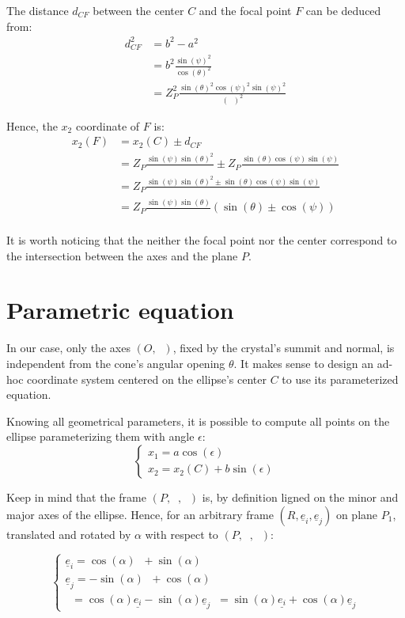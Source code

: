 \documentclass[a4paper,11pt,twoside,titlepage,openright]{book}
\numberwithin{equation}{section}
\newcommand{\ud}[1]{\underline{#1}}
\newcommand{\lt}{\left}
\newcommand{\rt}{\right}
\DeclareMathOperator{\ei}{\underline{e}_1}
\DeclareMathOperator{\et}{\underline{e}_2}
\DeclareMathOperator{\ez}{\underline{e}_z}
\DeclareMathOperator{\DD}{\cos(\theta)^2 - \sin(\psi)^2}
\begin{document}
The distance $d_{CF}$ between the center $C$ and the focal point $F$ can be deduced from:
$$
\begin{array}{lll}
	d_{CF}^2 & = b^2-a^2\\
		& = b^2\frac{\sin(\psi)^2}{\cos(\theta)^2}\\
		& = Z_P^2\frac{\sin(\theta)^2\cos(\psi)^2\sin(\psi)^2}{\lt(\DD\rt)^2}
\end{array}
$$

Hence, the $x_2$ coordinate of $F$ is:
$$
\begin{array}{lll}
	x_2(F) & = x_2(C) \pm d_{CF}\\
	       & = Z_P\frac{\sin(\psi)\sin(\theta)^2}{\DD} \pm Z_P\frac{\sin(\theta)\cos(\psi)\sin(\psi)}{\DD}\\
	       & = Z_P\frac{\sin(\psi)\sin(\theta)^2 \pm \sin(\theta)\cos(\psi)\sin(\psi)}{\DD}\\
	       & = Z_P\frac{\sin(\psi)\sin(\theta)}{\DD}\lt(\sin(\theta) \pm \cos(\psi)\rt)\\
\end{array}
$$

It is worth noticing that the neither the focal point nor the center correspond to the intersection between the axes and the plane $P$.


\section{Parametric equation}

In our case, only the axes $(O, \ez)$, fixed by the crystal's summit and normal, is independent from the cone's angular opening $\theta$.
It makes sense to design an ad-hoc coordinate system centered on the ellipse's center $C$ to use its parameterized equation.

Knowing all geometrical parameters, it is possible to compute all points on the ellipse parameterizing them with angle $\epsilon$:
$$
\lt\{
	\begin{array}{lll}
		x_1 = a\cos(\epsilon)\\
		x_2 = x_2(C) + b\sin(\epsilon)
	\end{array}
\rt.
$$

Keep in mind that the frame $(P, \ei, \et)$ is, by definition ligned on the minor and major axes of the ellipse.
Hence, for an arbitrary frame $(R, \ud{e}_i, \ud{e}_j)$ on plane $P_1$, translated and rotated by $\alpha$ with respect to $(P, \ei, \et)$:

$$
\lt\{
	\begin{array}{lll}
		\ud{e}_i = \cos(\alpha)\ei + \sin(\alpha)\et\\
		\ud{e}_j = -\sin(\alpha)\ei + \cos(\alpha)\et\\
		\ei = \cos(\alpha)\ud{e_i} - \sin(\alpha)\ud{e}_j
		\et = \sin(\alpha)\ud{e_i} + \cos(\alpha)\ud{e}_j
	\end{array}
\rt.
$$
\end{document}
